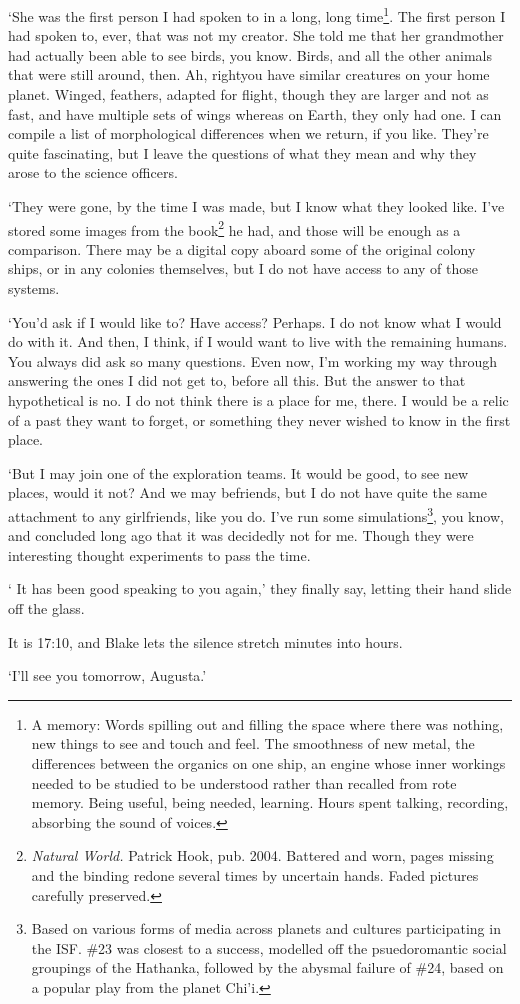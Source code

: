 `She was the first person I had spoken to in a long, long
time\footnote{A memory: Words spilling out and filling the space where
there was nothing, new things to see and touch and feel. The
smoothness of new metal, the differences between the organics on one
ship, an engine whose inner workings needed to be studied to be
understood rather than recalled from rote memory. Being useful, being
needed, learning. Hours spent talking, recording, absorbing the sound
of voices.}. The first person I had spoken to, ever, that was not my
creator. She told me that her grandmother had actually been able to
see birds, you know. Birds, and all the other animals that were still
around, then. Ah, right\textemdash you have similar creatures on
your home planet. Winged, feathers, adapted for flight, though they
are larger and not as fast, and have multiple sets of wings whereas on
Earth, they only had one. I can compile a list of morphological
differences when we return, if you like. They're quite fascinating,
but I leave the questions of what they mean and why they arose to the
science officers.

`They were gone, by the time I was made, but I know what they looked
like. I've stored some images from the book\footnote{\textit{Natural
World.} Patrick Hook, pub. 2004. Battered and worn, pages missing and
the binding redone several times by uncertain hands. Faded pictures
carefully preserved.} he had, and those will be enough as a
comparison. There may be a digital copy aboard some of the original
colony ships, or in any colonies themselves, but I do not have access
to any of those systems.

`You'd ask if I would like to? Have access? Perhaps. I do not know what
I would do with it. And then, I think, if I would want to live with
the remaining humans. You always did ask so many questions. Even now,
I'm working my way through answering the ones I did not get to, before
all this. But the answer to that hypothetical is no. I do not think
there is a place for me, there. I would be a relic of a past they want
to forget, or something they never wished to know in the first place.

`But I may join one of the exploration teams. It would be good, to see
new places, would it not? And we may be\textellipsis friends, but I
do not have quite the same attachment to any girlfriends, like you
do. I've run some simulations\footnote{
 Based on various forms of media across planets and cultures
participating in the ISF. \#23 was closest to a success, modelled off
the psuedoromantic social groupings of the Hathanka, followed by the
abysmal failure of \#24, based on a popular play from the planet Chi'i.
}, you know, and concluded long ago
that it was decidedly not for me. Though they were interesting thought
experiments to pass the time.

`\textellipsis{} It has been good speaking to you again,' they finally
say, letting their hand slide off the glass.

It is 17:10, and Blake lets the silence stretch minutes into hours.

`I'll see you tomorrow, Augusta.'
